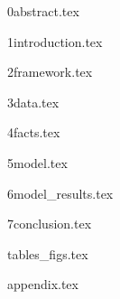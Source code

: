 \documentclass[12pt,english]{article}
\begin{document}
\newcommand{\var}{\text{var}}

{0abstract.tex}

{1introduction.tex}

{2framework.tex}

{3data.tex}

{4facts.tex}

{5model.tex}

{6model_results.tex}

{7conclusion.tex}


{tables_figs.tex}

\clearpage




{appendix.tex}
\end{document}
